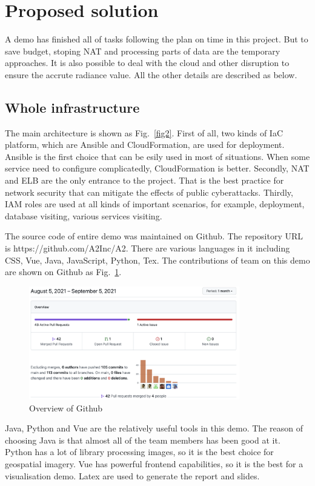 \documentclass[conference]{IEEEtran}
\begin{document}
\section{Proposed solution}

A demo has finished all of tasks following the plan on time in this project. But to save budget, stoping NAT and processing parts of data are 
the temporary approaches. It is also possible to deal with the cloud and other disruption to ensure the accrute radiance value. All the 
other details are described as below.

\subsection{Whole infrastructure}

The main architecture is shown as Fig.~\ref{fig2}. First of all, two kinds of IaC platform, which are Ansible and CloudFormation, are used for deployment.
Ansible is the first choice that can be esily used in most of situations. When some service need to configure complicatedly, CloudFormation is 
better. Secondly, NAT and ELB are the only entrance to the project. That is the best practice for network security that can mitigate the effects 
of public cyberattacks. Thirdly, IAM roles are used at all kinds of important scenarios, for example, deployment, database visiting, various services visiting.

The source code of entire demo was maintained on Github. The repository URL is https://github.com/A2Inc/A2. There are various languages in it including 
CSS, Vue, Java, JavaScript, Python, Tex. The contributions of team on this demo are shown on Github as Fig.~\ref{fig3}.

\begin{figure}[htbp]
    \centerline{\includegraphics[width=260pt]{images/github.png}}
    \caption{Overview of Github}
    \label{fig3}
\end{figure}

Java, Python and Vue are the relatively useful tools in this demo. The reason of choosing Java is that almost all of the team members has been good at it. Python 
has a lot of library processing images, so it is the best choice for geospatial imagery. Vue has powerful frontend capabilities, so it is the best for a 
visualisation demo. Latex are used to generate the report and slides.
\end{document}
